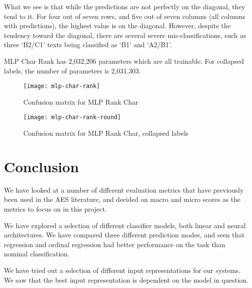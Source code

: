 What we see is that while the predictions are not perfectly on the diagonal,
they tend to it. For four out of seven rows, and five out of seven columns
(all columns with predictions), the highest value is on the diagonal.
However, despite the tendency toward the diagonal, there are several severe
mis-classifications, such as three `B2/C1' texts being classified as `B1' and
`A2/B1'.

MLP Char Rank has 2,032,206 parameters which are all trainable. For collapsed
labels, the number of parameters is 2,031,303.

\begin{figure}
  \centering
  \texttt{[image: mlp-char-rank]}
  \caption{Confusion matrix for MLP Rank Char}
  \label{fig:mlp-char-rank}
\end{figure}

\begin{figure}
  \centering
  \texttt{[image: mlp-char-rank-round]}
  \caption{Confusion matrix for MLP Rank Char, collapsed labels}
  \label{fig:mlp-char-rank-round}
\end{figure}


\section{Conclusion}

We have looked at a number of different evaluation metrics that have
previously been used in the \ac{AES} literature, and decided on macro and
micro \FI scores as the metrics to focus on in this project.

We have explored a selection of different classifier models, both linear and
neural architectures. We have compared three different prediction modes, and
seen that regression and ordinal regression had better performance on the
task than nominal classification.

We have tried out a selection of different input representations for our
systems. We saw that the best input representation is dependent on the model
in question.
